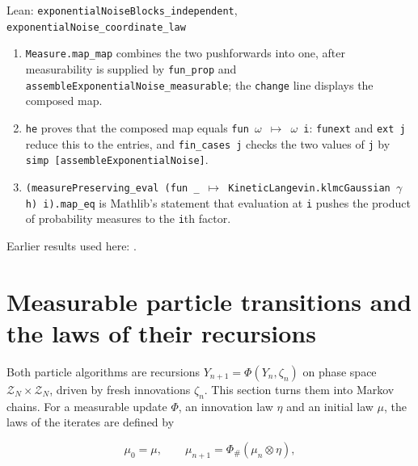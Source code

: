 \documentclass[11pt,a4paper]{report}
\begin{document}
\begin{leanbox}{Lean: \texttt{exponentialNoiseBlocks\_\allowbreak{}independent}, \texttt{exponentialNoise\_\allowbreak{}coordinate\_\allowbreak{}law}}
\begin{enumerate}


\item \texttt{Measure.\allowbreak{}map\_\allowbreak{}map} combines the two pushforwards into one, after measurability is supplied by \texttt{fun\_\allowbreak{}prop} and \texttt{assemble\allowbreak{}Exponential\allowbreak{}Noise\_\allowbreak{}measurable}; the \texttt{change} line displays the composed map.

\item \texttt{he} proves that the composed map equals \texttt{fun \ensuremath{\omega} \ensuremath{\mapsto} \ensuremath{\omega} i}: \texttt{funext} and \texttt{ext j} reduce this to the entries, and \texttt{fin\_\allowbreak{}cases j} checks the two values of \texttt{j} by \texttt{simp [assemble\allowbreak{}Exponential\allowbreak{}Noise]}.

\item \texttt{(measure\allowbreak{}Preserving\_\allowbreak{}eval (fun \_\allowbreak{} \ensuremath{\mapsto} Kinetic\allowbreak{}Langevin.\allowbreak{}klmc\allowbreak{}Gaussian \ensuremath{\gamma} h) i).\allowbreak{}map\_\allowbreak{}eq} is Mathlib's statement that evaluation at \texttt{i} pushes the product of probability measures to the \texttt{i}th factor.

\end{enumerate}
\end{leanbox}


Earlier results used here: \cite[Section~3.26.3]{LangevinLean2026Kinetic}.
\section{\texorpdfstring{Measurable particle transitions and the laws of their recursions}{Measurable particle transitions and the laws of their recursions}}
\label{proof-module-KIPLMC-Laws-lean}


Both particle algorithms are recursions \(Y_{n+1}=\Phi(Y_n,\zeta_n)\) on phase space \(\mathcal Z_N\times\mathcal Z_N\), driven by fresh innovations \(\zeta_n\). This section turns them into Markov chains. For a measurable update \(\Phi\), an innovation law \(\eta\) and an initial law \(\mu\), the laws of the iterates are defined by


\[\mu_0=\mu,\qquad\mu_{n+1}=\Phi_\#(\mu_n\otimes\eta),\]
\end{document}
